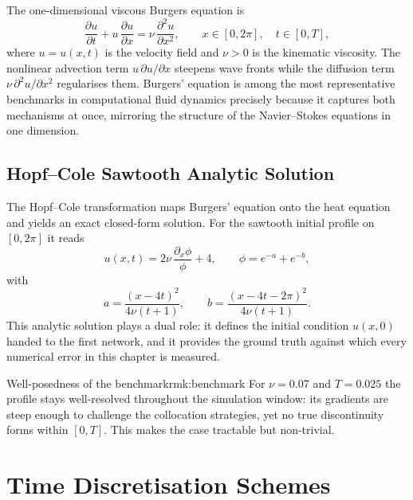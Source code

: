 The one-dimensional viscous Burgers equation is
\begin{equation}
  \frac{\partial u}{\partial t}
  + u\,\frac{\partial u}{\partial x}
  = \nu\,\frac{\partial^2 u}{\partial x^2},
  \qquad x \in [0, 2\pi],\quad t \in [0, T],
  \label{eq:burgers}
\end{equation}
where $u = u(x,t)$ is the velocity field and $\nu > 0$ is the kinematic
viscosity. The nonlinear advection term $u\,\partial u/\partial x$ steepens
wave fronts while the diffusion term $\nu\,\partial^2 u/\partial x^2$
regularises them. Burgers' equation is among the most representative
benchmarks in computational fluid dynamics precisely because it captures both
mechanisms at once, mirroring the structure of the Navier--Stokes equations in
one dimension.

\subsection{Hopf--Cole Sawtooth Analytic Solution}

The Hopf--Cole transformation maps Burgers' equation onto the heat equation
and yields an exact closed-form solution. For the sawtooth initial profile on
$[0,2\pi]$ it reads
\begin{equation}
  u(x,t)
  = 2\nu\,\frac{\partial_x \phi}{\phi} + 4,
  \qquad
  \phi = e^{-a} + e^{-b},
  \label{eq:hopf_cole}
\end{equation}
with
\[
  a = \frac{(x - 4t)^2}{4\nu(t+1)},
  \qquad
  b = \frac{(x - 4t - 2\pi)^2}{4\nu(t+1)}.
\]
This analytic solution plays a dual role: it defines the initial condition
$u(x,0)$ handed to the first network, and it provides the ground truth against
which every numerical error in this chapter is measured.

\begin{Rmk}{Well-posedness of the benchmark}{rmk:benchmark}
  For $\nu = 0.07$ and $T = 0.025$ the profile stays well-resolved throughout
  the simulation window: its gradients are steep enough to challenge the
  collocation strategies, yet no true discontinuity forms within $[0,T]$. This
  makes the case tractable but non-trivial.
\end{Rmk}

\section{Time Discretisation Schemes}

